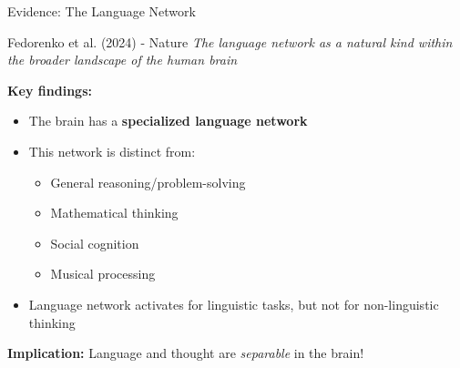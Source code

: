 \documentclass[aspectratio=169]{beamer}
\begin{document}
\begin{frame}[shrink=10]{Evidence: The Language Network 🧠}
\small
\begin{block}{Fedorenko et al. (2024) - Nature}
\textit{The language network as a natural kind within the broader landscape of the human brain}
\end{block}

\vspace{0.3cm}

\textbf{Key findings:}
\begin{itemize}\setlength{\itemsep}{0pt}
    \item The brain has a \textbf{specialized language network}
    \item This network is distinct from:
    \begin{itemize}\setlength{\itemsep}{0pt}
        \item General reasoning/problem-solving
        \item Mathematical thinking
        \item Social cognition
        \item Musical processing
    \end{itemize}
    \item Language network activates for linguistic tasks, but not for non-linguistic thinking
\end{itemize}

\vspace{0.3cm}

\textbf{Implication:} Language and thought are \textit{separable} in the brain!
\end{frame}
\end{document}

